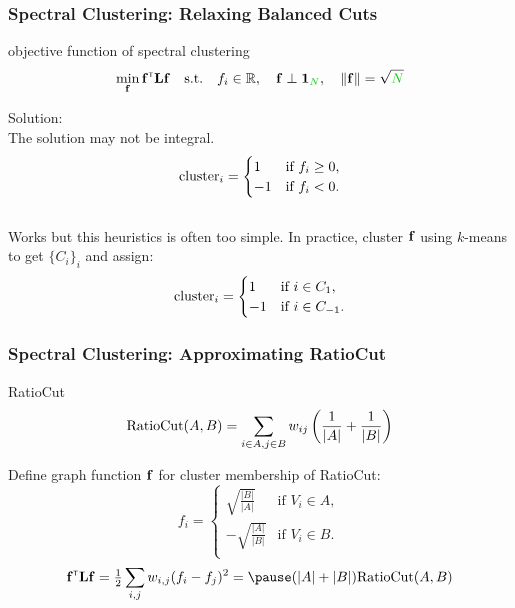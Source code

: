 \documentclass{beamer}
\begin{document}
\begin{frame}
\frametitle{Spectral Clustering: Relaxing Balanced Cuts}
\begin{block}{\centering objective function of spectral clustering}
\[
\min_{\bff} \bff\transpose \bL \bff \quad {\rm s.t.} 
\quad f_i \in \R,
\quad \bff \perp \bOne_\nodes, 
\quad \|\bff\| =  \sqrt{\nodes}
\]
\end{block}

Solution: \pause {}  
\\ \smallskip \pause 
The solution may not be integral. 
\\ \smallskip \pause 
\[
{\rm cluster}_i = 
\begin{cases}
1 & \mbox{if } f_i \geq 0, \\
-1 & \mbox{if } f_i < 0. \end{cases}
\]
\\ \pause 
Works but this heuristics is often too simple. \pause In practice, cluster $\mathbf{f}$ using $k$-means to get 
$\{C_i\}_{i}$ and assign:
\\  \pause 
\[
{\rm cluster}_i = 
\begin{cases}
1 & \mbox{if } i \in C_1, \\
-1 & \mbox{if } i \in C_{-1}. \end{cases}
\]
\end{frame}
\begin{frame}
\frametitle{Spectral Clustering: Approximating RatioCut}
\begin{center}
\end{center}
\pause
\begin{block}{RatioCut}
\[{\rm RatioCut}(A,B)= \sum_{i\in A, j\in B} w_{ij} \left( \frac{1}{|A|} + \frac{1}{|B|} \right) \]
\end{block}
\pause
Define graph function $\mathbf{f}$ for cluster membership of RatioCut\pause : 
\[ f_i = 
\begin{cases}
\sqrt{\frac{|B|}{|A|}} & \mbox{if } V_i \in A, \\
- \sqrt{\frac{|A|}{|B|}} & \mbox{if } V_i \in B. \\ 
\end{cases} \]
 \pause
\[
\bff\transpose \bL \bff 
= \tfrac12  \sum_{i,j}  w_{i,j} (f_i-f_j)^2
= \pause (|A|+|B|) {\rm RatioCut}(A,B)
\]
\end{frame}
\end{document}
